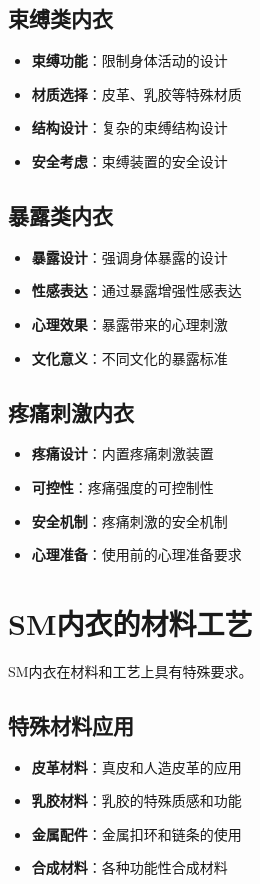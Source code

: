 \documentclass[12pt,UTF8]{ctexbook}
\begin{document}
\subsection{束缚类内衣}
\begin{itemize}[leftmargin=2cm]
	\item \textbf{束缚功能}：限制身体活动的设计
	\item \textbf{材质选择}：皮革、乳胶等特殊材质
	\item \textbf{结构设计}：复杂的束缚结构设计
	\item \textbf{安全考虑}：束缚装置的安全设计
\end{itemize}

\subsection{暴露类内衣}
\begin{itemize}[leftmargin=2cm]
	\item \textbf{暴露设计}：强调身体暴露的设计
	\item \textbf{性感表达}：通过暴露增强性感表达
	\item \textbf{心理效果}：暴露带来的心理刺激
	\item \textbf{文化意义}：不同文化的暴露标准
\end{itemize}

\subsection{疼痛刺激内衣}
\begin{itemize}[leftmargin=2cm]
	\item \textbf{疼痛设计}：内置疼痛刺激装置
	\item \textbf{可控性}：疼痛强度的可控制性
	\item \textbf{安全机制}：疼痛刺激的安全机制
	\item \textbf{心理准备}：使用前的心理准备要求
\end{itemize}

\section{SM内衣的材料工艺}
SM内衣在材料和工艺上具有特殊要求。

\subsection{特殊材料应用}
\begin{itemize}[leftmargin=2cm]
	\item \textbf{皮革材料}：真皮和人造皮革的应用
	\item \textbf{乳胶材料}：乳胶的特殊质感和功能
	\item \textbf{金属配件}：金属扣环和链条的使用
	\item \textbf{合成材料}：各种功能性合成材料
\end{itemize}
\end{document}
